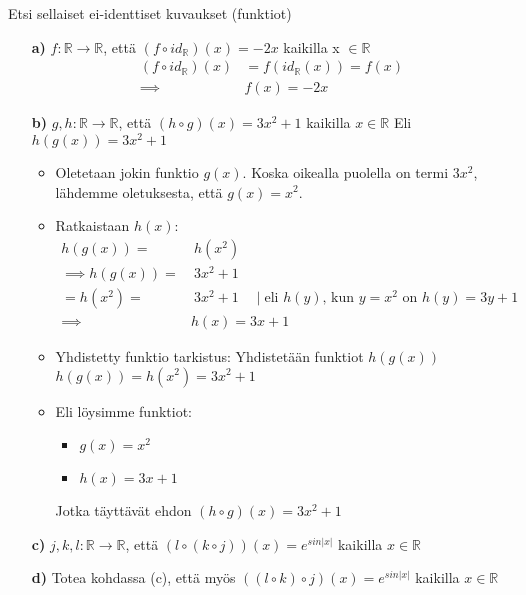 \documentclass{article}
\begin{document}
    Etsi sellaiset ei-identtiset kuvaukset (funktiot)
    \begin{itemize}
        \item[\textbf{a)}] $f : \mathbb{R} \rightarrow \mathbb{R}$, että $(f \circ id_\mathbb{R})(x) = -2x$ kaikilla x $\in \mathbb{R}$
        \[
            \begin{aligned}
                (f \circ id_{\mathbb{R}})(x) &= f(id_{\mathbb{R}}(x)) = f(x) \\
                \implies & f(x) = -2x
            \end{aligned}
        \]

        \item[\textbf{b)}] $g, h: \mathbb{R} \rightarrow \mathbb{R}$, että $(h \circ g)(x) = 3x^2 + 1$ kaikilla $x \in \mathbb{R}$\newline
        Eli $h(g(x)) = 3x^2 + 1$
        \begin{itemize}
            \item Oletetaan jokin funktio $g(x)$. Koska oikealla puolella on termi $3x^2$, lähdemme oletuksesta, että $g(x) = x^2$.
            \item Ratkaistaan $h(x)$:
            \[
                \begin{aligned}
                    h(g(x)) = & \  h(x^2)\\
                    \implies h(g(x)) = & \ 3x^2 + 1\\
                    = h(x^2) = & \ 3x^2 + 1 \quad \mid \text{eli $h(y)$, kun $y = x^2$ on $h(y) = 3y + 1$} \\
                    \implies & h(x) = 3x + 1                                        
                \end{aligned}
            \]
            \item Yhdistetty funktio tarkistus:\newline
            Yhdistetään funktiot $h(g(x))$\newline
            $h(g(x)) = h(x^2) = 3x^2 + 1$
            \item Eli löysimme funktiot:
            \begin{itemize}
                \item $g(x) = x^2$
                \item $h(x) = 3x + 1$
            \end{itemize}
            Jotka täyttävät ehdon $(h \circ g)(x) = 3x^2 + 1$

            
        \end{itemize}



        \item[\textbf{c)}] $j, k, l : \mathbb{R} \rightarrow \mathbb{R}$, että $(l \circ (k \circ j))(x) = e^{sin |x|}$ kaikilla $x \in \mathbb{R}$

        \item[\textbf{d)}] Totea kohdassa (c), että myös $((l \circ k) \circ j)(x) = e^{sin |x|}$ kaikilla $x \in \mathbb{R}$
    \end{itemize}
\end{document}
